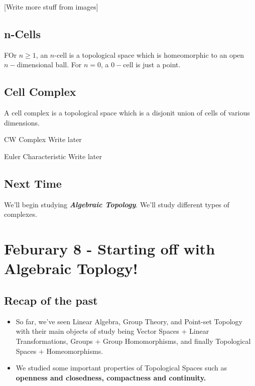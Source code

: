 \documentclass{article}
\begin{document}
\vskip 0.5cm
[Write more stuff from images]

\vskip 0.5cm
\subsection*{n-Cells}
FOr $n \geq 1$, an $n$-cell is a topological space which is homeomorphic to an open $n-$dimensional ball. For $n = 0$, a $0-$cell is just a point.


\vskip 0.5cm
\subsection*{Cell Complex}
\begin{mathdefinitionbox}{}
  A cell complex is a topological space which is a disjonit union of cells of various dimensions.
\end{mathdefinitionbox}

\begin{mathdefinitionbox}{CW Complex}
  \vskip 0.5cm
  Write later
\end{mathdefinitionbox}

\begin{mathdefinitionbox}{Euler Characteristic}
  \vskip 0.25cm
  Write later
\end{mathdefinitionbox}

\subsection*{Next Time}
We'll begin studying \emph{\textbf{Algebraic Topology}}. We'll study different types of complexes.

\pagebreak

\section{Feburary 8 - Starting off with Algebraic Toplogy!}

\vskip 0.5cm
\subsection{Recap of the past}

\vskip 0.5cm
\begin{itemize}
  \item So far, we've seen Linear Algebra, Group Theory, and Point-set Topology with their main objects of study being Vector Spaces + Linear Transformations, Groups + Group Homomorphisms, and finally Topological Spaces + Homeomorphisms.
  \item We studied some important properties of Topological Spaces such as \textbf{openness and closedness, compactness and continuity.}
\end{itemize}
\end{document}
